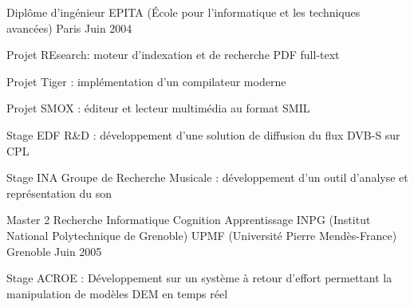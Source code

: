 

\begin{cventries}

  \cventry
    {Diplôme d'ingénieur} %
    {EPITA (École pour l'informatique et les techniques avancées)} %
    {Paris} %
    {Juin 2004} %
    {
      \begin{cvitems} %
        \item {Projet REsearch: moteur d'indexation et de recherche PDF full-text}
        \item {Projet Tiger : implémentation d'un compilateur moderne}
        \item {Projet SMOX : éditeur et lecteur multimédia au format SMIL}
        \item {Stage EDF R\&D : développement d'une solution de diffusion du flux DVB-S sur CPL}
        \item {Stage INA Groupe de Recherche Musicale : développement d'un outil d’analyse et représentation du son}
      \end{cvitems}
    }

  \cventry
    {Master 2 Recherche Informatique Cognition Apprentissage} %
    {INPG (Institut National Polytechnique de Grenoble) \linebreak UPMF (Université Pierre Mendès-France)} %
    {Grenoble} %
    {Juin 2005} %
    {
      \begin{cvitems} %
        \item {Stage ACROE : Développement sur un système à retour d'effort permettant la manipulation de modèles DEM en temps réel}
      \end{cvitems}
    }

\end{cventries}

